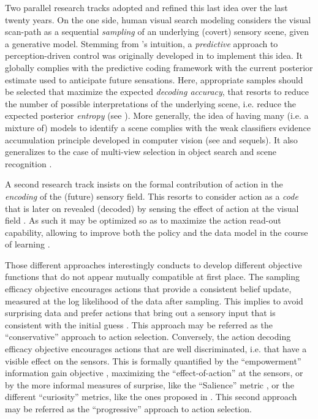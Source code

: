 \documentclass[12pt,twoside,openright]{article}
\begin{document}
Two parallel research tracks adopted and refined this last idea over the last twenty years.
On the one side, human visual search modeling considers the visual scan-path as a sequential \emph{sampling} of an underlying (covert) sensory scene, given a generative model. 
Stemming from \citep{bajcsy1988active}'s intuition, a \emph{predictive} approach to perception-driven control was originally developed in \citep{najemnik2005optimal} to implement this idea.
It globally complies with the predictive coding framework \citep{rao1999predictive} with the current posterior estimate used to anticipate future sensations. 
Here, appropriate samples should be selected that maximize the expected \emph{decoding accuracy}, that resorts to reduce the number of possible interpretations of the underlying scene, i.e. reduce the expected posterior \emph{entropy} (see \citet{najemnik2005optimal,najemnik2009simple,butko2010infomax,friston2012perceptions}).
More generally, the idea of having many (i.e. a mixture of) models to identify a scene complies with the weak classifiers evidence accumulation principle developed in computer vision (see \citet{viola2003fast} and sequels). It also generalizes to the case of multi-view selection in object search and scene recognition \citep{potthast2016active}.

A second research track insists on the formal contribution of action in the \emph{encoding} of the (future) sensory field. This resorts to consider action as a \emph{code} that is later on revealed (decoded) by sensing the effect of action at the visual field \citep{klyubin2005empowerment,tishby2011information}. As such it may be optimized so as to maximize the action read-out capability, allowing to improve both the policy and the data model in the course of learning \citep{schmidhuber2007simple,mohamed2015variational,houthooft2016vime}.


Those different approaches interestingly conducts to develop different objective functions that do not appear mutually compatible at first place.
The sampling efficacy objective encourages actions that provide a consistent belief update, measured at the log likelihood of the data after sampling. This implies to avoid surprising data and prefer actions that bring out a sensory input that is consistent with the initial guess \citep{friston2010free}. This  approach may be referred as the ``conservative'' approach to action selection.  
Conversely,{ \color{Purple} the action decoding efficacy objective encourages actions that are well discriminated, i.e. that have a visible effect on the sensors. This is formally quantified by the ``empowerment'' information gain objective \citep{klyubin2005empowerment,tishby2011information}, maximizing the ``effect-of-action'' at the sensors, or by the more informal measures of surprise, like the ``Salience'' metric \citep{itti2005bayesian}, or the
different ``curiosity'' metrics, like the ones proposed in \citet{schmidhuber1991curious,oudeyer2008can, pathak2017curiosity}}. This second approach may be referred as the ``progressive'' approach to action selection. 
\end{document}
